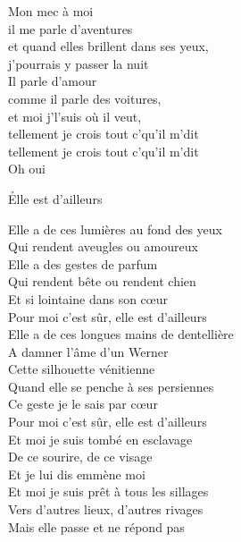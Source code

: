 \documentclass{novel}
\begin{document}
{\begin{minipage}[t][0.4\textheight][t]{\textwidth}
\begin{multicols}{2}
Mon mec à moi \\
il me parle d'aventures \\
et quand elles brillent dans ses yeux, \\
j'pourrais y passer la nuit \\
Il parle d'amour \\
comme il parle des voitures, \\
et moi j'l'suis où il veut, \\
tellement je crois tout c'qu'il m'dit \\
tellement je crois tout c'qu'il m'dit \\
Oh oui \\
\end{multicols}
\end{minipage}
\vspace{0.07\textheight}

\begin{minipage}[b][0.55\textheight][t]{\textwidth}
\h*{Elle est d’ailleurs}
\begin{multicols}{2}
\footnotesize
Elle a de ces lumières au fond des yeux \\
Qui rendent aveugles ou amoureux \\
Elle a des gestes de parfum \\
Qui rendent bête ou rendent chien \\
Et si lointaine dans son cœur \\
Pour moi c'est sûr, elle est d'ailleurs \\

Elle a de ces longues mains de dentellière \\
A damner l'âme d'un Werner \\
Cette silhouette vénitienne \\
Quand elle se penche à ses persiennes \\
Ce geste je le sais par cœur \\
Pour moi c'est sûr, elle est d'ailleurs \\

Et moi je suis tombé en esclavage \\
De ce sourire, de ce visage \\
Et je lui dis emmène moi \\
Et moi je suis prêt à tous les sillages \\
Vers d'autres lieux, d'autres rivages \\
Mais elle passe et ne répond pas \\


\end{multicols}
\end{minipage}}
\end{document}

